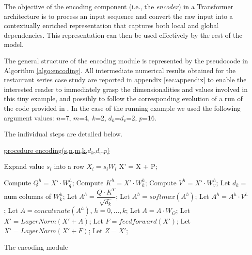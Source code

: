 \documentclass[algorithms,article,submit,pdftex,moreauthors]{Definitions/mdpi}
\begin{document}
The objective of the encoding component (i.e., the \textit{encoder}) in a Transformer architecture is to process an input sequence and convert the raw input into a contextually enriched representation that captures both local and global dependencies. This representation can then be used effectively by the rest of the model.

The general structure of the encoding module is represented by the pseudocode in Algorithm \ref{algo:encoding}. All intermediate numerical results obtained for the restaurant series case study are reported in appendix \ref{sec:appendix} to enable the interested reader to immediately grasp the dimensionalities and values involved in this tiny example, and possibly to follow the corresponding evolution of a run of the code provided in \cite{G25}. In the case of the running example we used the following argument values: $n$=7, $m$=4, $k$=2, $d_k$=$d_v$=2, $p$=16.

The individual steps are detailed below.

\begin{algorithm2e}

        \underline{procedure encoding(s,n,m,k,$d_k$,$d_v$,$p$)} \label{algo:encoding}
        
        
        {\label{enc:seca1}
            Expand value $s_i$ into a row $X_i = s_iW_i$
        }   \label{enc:seca2}
        X' = X + P;\; \label{enc:positional}
        
	{ \label{enc:encoding-block1}
            {	\label{enc:multihead1}
                Compute $Q^h=X'\cdot W_q^h$;\; \label{enc:qh}
                Compute $K^h=X'\cdot W_k^h$;\; \label{enc:kh}
                Compute $V^h=X'\cdot W_v^h$;\; \label{enc:vh}
                Let $d_k=$ num columns of $W^h_k$;\; \label{enc:dk}
                Let $A^h = \dfrac{Q \cdot K^T}{\sqrt{d_k}}$;  \label{enc:attention1}
                Let $A^h = softmax\left(A^h\right)$;  \label{enc:softmax}
                Let $A^h = A^h\cdot V^h$;  \label{enc:attention2}
            } \label{enc:multihead2}
            Let $A=concatenate(A^h)$, $h=0,\dots,k$;\; \label{enc:concatenation}
            Let $A = A \cdot W_O$;  \label{enc:outproj} 
            Let $X' = LayerNorm(X' + A)$;\; \label{enc:addnorm1}
            Let $F = feedforward(X')$;  \label{enc:ffn}
            Let $X' = LayerNorm(X' + F)$;\; \label{enc:addnorm2}
        }   \label{enc:encoding-block2}                  
        Let $Z = X'$; \label{enc:output}
	\caption{The encoding module}
\end{algorithm2e}
\end{document}
